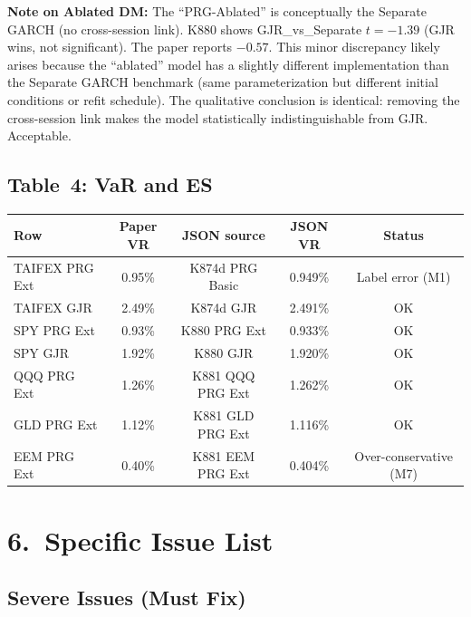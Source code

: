 \documentclass[12pt,a4paper]{article}
\begin{document}
\noindent\textbf{Note on Ablated DM:} The ``PRG-Ablated'' is conceptually the Separate GARCH (no cross-session link). K880 shows GJR\_vs\_Separate $t = -1.39$ (GJR wins, not significant). The paper reports $-0.57$. This minor discrepancy likely arises because the ``ablated'' model has a slightly different implementation than the Separate GARCH benchmark (same parameterization but different initial conditions or refit schedule). The qualitative conclusion is identical: removing the cross-session link makes the model statistically indistinguishable from GJR. Acceptable.

\subsection*{Table~4: VaR and ES}

\begin{longtable}{lcccc}
\toprule
Row & Paper VR & JSON source & JSON VR & Status \\
\midrule
TAIFEX PRG Ext & 0.95\% & K874d PRG Basic & 0.949\% & \textcolor{errorred}{Label error (M1)} \\
TAIFEX GJR & 2.49\% & K874d GJR & 2.491\% & \textcolor{okgreen}{OK} \\
SPY PRG Ext & 0.93\% & K880 PRG Ext & 0.933\% & \textcolor{okgreen}{OK} \\
SPY GJR & 1.92\% & K880 GJR & 1.920\% & \textcolor{okgreen}{OK} \\
QQQ PRG Ext & 1.26\% & K881 QQQ PRG Ext & 1.262\% & \textcolor{okgreen}{OK} \\
GLD PRG Ext & 1.12\% & K881 GLD PRG Ext & 1.116\% & \textcolor{okgreen}{OK} \\
EEM PRG Ext & 0.40\% & K881 EEM PRG Ext & 0.404\% & \textcolor{warncolor}{Over-conservative (M7)} \\
\bottomrule
\end{longtable}


\section*{6.\ Specific Issue List}

\subsection*{\textcolor{errorred}{Severe Issues (Must Fix)}}
\end{document}
